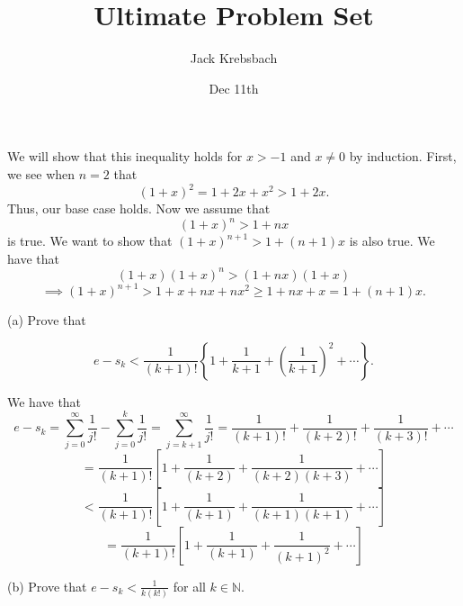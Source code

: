 \documentclass{report}
\title{Ultimate Problem Set}
\author{Jack Krebsbach }
\date{Dec 11th}
\begin{document}
\maketitle




\begin{myproof}
We will show that this inequality holds for $x>-1$ and $x\not= 0$ by induction. First, we see when $n=2$ that $$ (1+x)^2 = 1 +2x + x^2 > 1+2x.$$ Thus, our base case holds. Now we assume that $$ (1+x)^n > 1 +nx$$ is true. We want to show that
$ (1+x)^{n+1} > 1 +(n+1)x$
is also true. We have that $$(1+x)(1+x)^n > (1+nx)(1+x)$$
$$ \implies (1+x)^{n+1} > 1 + x + nx + nx^2 \geq 1 + nx + x = 1 + (n+1)x.$$

\end{myproof}

\pagebreak
{}

(a) Prove that

$$
e-s_k<\frac{1}{(k+1) !}\left\{1+\frac{1}{k+1}+\left(\frac{1}{k+1}\right)^2+\cdots\right\} .
$$

\begin{myproof}
    
We have that
$$ e-s_k = \sum_{j=0}^{\infty} \frac{1}{j !} - \sum_{j=0}^k \frac{1}{j !} = \sum_{j=k+1}^{\infty} \frac{1}{j !} = \frac{1}{(k+1)!} +\frac{1}{(k+2)!}+ \frac{1}{(k+3)!} + \cdots$$ $$= \frac{1}{(k+1)!}\left[1 + \frac{1}{(k+2)}  + \frac{1}{(k+2)(k+3)} + \cdots \right]$$
$$< \frac{1}{(k+1)!}\left[1 + \frac{1}{(k+1)}  + \frac{1}{(k+1)(k+1)} + \cdots \right]$$
$$= \frac{1}{(k+1)!}\left[1 + \frac{1}{(k+1)}  + \frac{1}{(k+1)^2} + \cdots \right]$$
\bigskip
\end{myproof}
\bigskip
(b) Prove that $e-s_k<\frac{1}{k(k!)}$ for all $k \in \mathbb{N}$.
\end{document}
